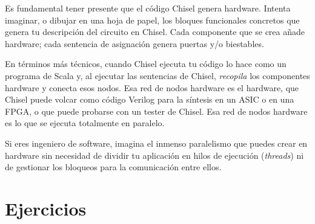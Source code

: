 \documentclass[%
    10pt,
    headinclude, footinclude=false,
    openright, %
    notitlepage,
    cleardoublepage=empty,
    headsepline,
    numbers=noenddot,
    bibliography=totoc, index=totoc,
    ]{scrbook}
\newcommand{\code}[1]{{\lstinline[basicstyle=\small\ttfamily]{#1}}}
\newcommand{\myref}[2]{\href{#1}{#2}}
\renewcommand{\myref}[2]{{#2}{\footnote{\url{#1}}}}
\begin{document}

Es fundamental tener presente que el código Chisel genera hardware.
Intenta imaginar, o dibujar en una hoja de papel, los bloques funcionales concretos que
genera tu descripción del circuito en Chisel.
Cada componente que se crea añade hardware; cada sentencia de asignación
genera puertas y/o biestables.


En términos más técnicos, cuando Chisel ejecuta tu código lo hace como un programa de Scala y,
al ejecutar las sentencias de Chisel, \emph{recopila} los componentes hardware
y conecta esos nodos. Esa red de nodos hardware es el hardware,
que Chisel puede volcar como código Verilog para la síntesis en un ASIC o en una FPGA, o que
puede probarse con un tester de Chisel.
Esa red de nodos hardware es lo que se ejecuta totalmente en paralelo.


Si eres ingeniero de software, imagina el inmenso paralelismo que puedes
crear en hardware sin necesidad de dividir tu aplicación en hilos de ejecución (\emph{threads})
ni de gestionar los bloqueos para la comunicación entre ellos.


\section{Ejercicios}

\end{document}
